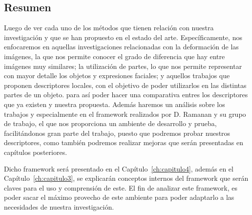 \subsection{Resumen}
Luego de ver cada uno de los métodos que tienen relación con nuestra investigación y que se han propuesto en el estado del arte. Específicamente, nos enfocaremos en aquellas investigaciones relacionadas con la deformación de las imágenes, la que nos permite conocer el grado de diferencia que hay entre imágenes muy similares; la utilización de partes, lo que nos permite representar con mayor detalle los objetos y expresiones faciales; y aquellos trabajos que proponen descriptores locales, con el objetivo de poder utilizarlos en las distintas partes de un objeto. para así poder hacer una comparativa entres los descriptores que ya existen y nuestra propuesta. Además haremos un análisis sobre los trabajos y especialmente en el framework realizados por D. Ramanan y su grupo de trabajo, el que nos proporciona un ambiente de desarrollo y prueba, facilitándonos gran parte del trabajo, puesto que podremos probar nuestros descriptores, como también podremos realizar mejoras que serán presentadas en capítulos posteriores.

Dicho framework será presentado en el Capítulo~\ref{ch:capitulo4}, además en el Capítulo~\ref{ch:capitulo3}, se explicarán conceptos internos del framework que serán claves para el uso y comprensión de este. El fin de analizar este framework, es poder sacar el máximo provecho de este ambiente para poder adaptarlo a las necesidades de nuestra investigación.




